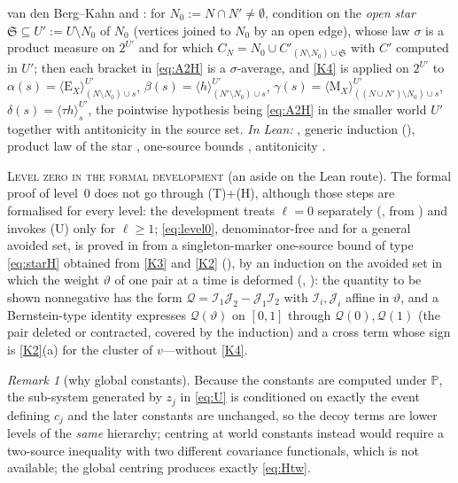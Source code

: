 \documentclass[11pt]{article}
\theoremstyle{definition}
\theoremstyle{remark}
\newtheorem{remark}[theorem]{Remark}
\newcommand{\PP}{\mathbb{P}}
\begin{document}
van den Berg--Kahn \citep{VandenBergKahn2001} and \citep[proof of Thm.~1.1]{VandenbergHaggstromKahn2005}: for $N_0:=N\cap N'\ne\emptyset$, condition on
the \emph{open star} $\mathfrak S\subseteq U':=U\setminus N_0$ of $N_0$ (vertices joined to $N_0$ by an open edge), whose law $\sigma$ is a product measure on
$2^{U'}$ and for which $C_N=N_0\cup C'_{(N\setminus N_0)\cup\mathfrak S}$ with $C'$ computed in $U'$; then each bracket in \eqref{eq:A2H} is a
$\sigma$-average, and \ref{K4} is applied on $2^{U'}$ to $\alpha(s)=\langle\mathrm E_X\rangle^{U'}_{(N\setminus N_0)\cup s}$,
$\beta(s)=\langle h\rangle^{U'}_{(N'\setminus N_0)\cup s}$, $\gamma(s)=\langle\mathrm M_X\rangle^{U'}_{((N\cup N')\setminus N_0)\cup s}$,
$\delta(s)=\langle\tau h\rangle^{U'}_{s}$, the pointwise hypothesis being \eqref{eq:A2H} in the smaller world $U'$ together with antitonicity in the
source set.  \emph{In Lean:} , generic induction  (), product law of the star
, one-source bounds , antitonicity .

\textsc{Level zero in the formal development} (an aside on the Lean route).  The formal proof of level~$0$ does not go through (T)+(H),
although those steps are formalised for every level: the development treats $\ell=0$ separately
(, from ) and invokes (U) only for $\ell\ge1$; \eqref{eq:level0}, denominator-free and
for a general avoided set, is proved in  from a singleton-marker one-source bound of type \eqref{eq:starH} obtained from
\ref{K3} and \ref{K2} (), by an induction on the avoided set in which the weight $\vartheta$ of one pair at a time is deformed
(, ): the quantity to be shown nonnegative has the form $\mathcal Q=\mathcal I_1\mathcal J_2-\mathcal J_1\mathcal I_2$
with $\mathcal I_i,\mathcal J_i$ affine in $\vartheta$, and a Bernstein-type identity expresses $\mathcal Q(\vartheta)$ on $[0,1]$ through
$\mathcal Q(0),\mathcal Q(1)$ (the pair deleted or contracted, covered by the induction) and a cross term whose sign is \ref{K2}(a) for the cluster
of $v$---without \ref{K4}.

\begin{remark}[why global constants]\label{rem:global}
Because the constants are computed under $\PP$, the sub-system generated by $z_j$ in \eqref{eq:U} is conditioned on exactly the event
defining $c_j$ and the later constants are unchanged, so the decoy terms are lower levels of the \emph{same} hierarchy; centring at world
constants instead would require a two-source inequality with two different covariance functionals, which is not available; the global
centring produces exactly \eqref{eq:Htw}.
\end{remark}
\end{document}
